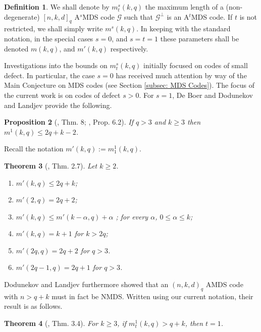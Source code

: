 \documentclass[11pt,a4paper]{amsart}
\newcommand{\G}{\mathcal{G}}
\theoremstyle{plain}
\newtheorem{theorem}{Theorem}[section]
\newtheorem{proposition}[theorem]{Proposition}
\theoremstyle{definition}
\newtheorem{definition}[theorem]{Definition}
\theoremstyle{remark}
\begin{document}
	\begin{definition}\label{def: m^s(k,q)}
		We shall denote by $m^{s}_t(k,q)$ the maximum length of a (non-degenerate) $[n,k,d]_q$ A$^s$MDS code $\G$ such that  $\G^\perp$ is an A$^t$MDS code. If $t$ is not restricted, we shall simply write $m^{s}(k,q)$. In keeping with the standard notation, in the special cases $s=0$, and $s=t=1$ these parameters shall be denoted $m(k,q)$, and $m'(k,q)$ respectively.
	\end{definition}

	Investigations into the bounds on $m^s_t(k,q)$ initially focused on codes of small defect. In particular, the case $s=0$ has received much attention by way of the Main Conjecture on MDS codes (see Section \ref{subsec: MDS Codes}). The focus of the current work is on codes of defect $s>0$.
	For $s=1$, De Boer \cite{MR1409442} and Dodunekov and Landjev \cite{MR1755411,MR1358272} provide the following.

	\begin{proposition}[\cite{MR1409442}, Thm. 8; \cite{MR1358272}, Prop. 6.2]  \label{prop: AMDS de Boer}
		If $q>3$ and $k\ge 3$ then $m^1(k,q)\le 2q+k-2$.
	\end{proposition}

	Recall the notation $m'(k,q):= m^1_1(k,q)$.
	\begin{theorem}[\cite{MR1755411}, Thm. 2.7] \label{thm: Dodunekov 2.7} Let $k\ge 2$.
		\begin{enumerate}
			\item  $m'(k,q) \le 2q+k$; \label{part: thm Dodunekov P1}
			\item $m'(2,q) = 2q+2$; \label{part: thm Dodunekov P2}
			\item $m'(k,q)\le m'(k-\alpha, q)+\alpha$  ; for every $\alpha$, $0\le \alpha \le k$; \label{part: thm Dodunekov P3}
			\item  $m'(k,q)=k+1 $ for $k>2q$; \label{part: thm Dodunekov P4}
			\item  $m'(2q,q)=2q+2$ for $q>3$. \label{part: thm Dodunekov P5}
			\item $m'(2q-1,q)=2q+1$ for $q>3$. \label{part: thm Dodunekov P6}
		\end{enumerate}
	\end{theorem}

	Dodunekov and Landjev furthermore showed that an $(n,k,d)_q$ AMDS code with $n>q+k$ must in fact be NMDS. Written using our current notation, their result is as follows.
	\begin{theorem}[\cite{MR1358272}, Thm. 3.4] \label{thm: long AMDS is NMDS}
		For $k\ge3$, if $m^1_t(k,q)>q+k$, then $t=1$.
	\end{theorem}
\end{document}
